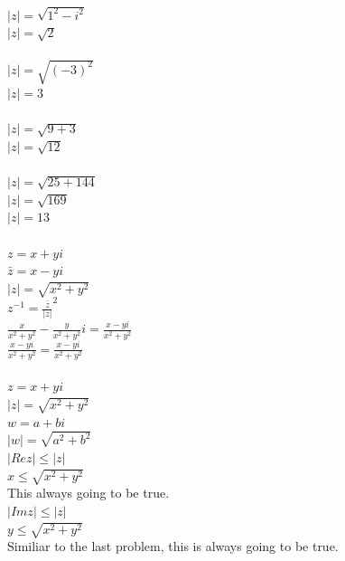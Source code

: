\documentclass[12pt]{article}
\begin{document}
\\
$|z| = \sqrt{1^2 - i^2}$\\
$|z| = \sqrt{2}$\\


\\
$|z| = \sqrt{(-3)^2}$\\
$|z| = 3$\\

\\
$|z| = \sqrt{9 + 3}$\\
$|z| = \sqrt{12}$\\

\\
$|z| = \sqrt{25 + 144}$\\
$|z| = \sqrt{169}$\\
$|z| = 13$\\

\\

$z = x + yi$\\
$\bar{z} = x - yi$\\
$|z| = \sqrt{x^2 + y^2}$\\

$z^{-1} = \frac{\bar{z}}{|z|}^2$\\

$\frac{x}{x^2+y^2} - \frac{y}{x^2+y^2}i = \frac{x-yi}{x^2 + y^2}$\\
$\frac{x-yi}{x^2 + y^2} = \frac{x-yi}{x^2 + y^2}$\\

\\

$z = x + yi$\\
$|z| = \sqrt{x^2 + y^2}$\\
$w = a + bi$\\
$|w| = \sqrt{a^2 + b^2}$\\


 $|Re z| \leq |z|$\\

$x \leq \sqrt{x^2 + y^2}$\\
This always going to be true.\\


 $|Im z| \leq |z|$\\
$y \leq \sqrt{x^2 + y^2}$\\
Similiar to the last problem, this is always going to be true.\\
\end{document}
